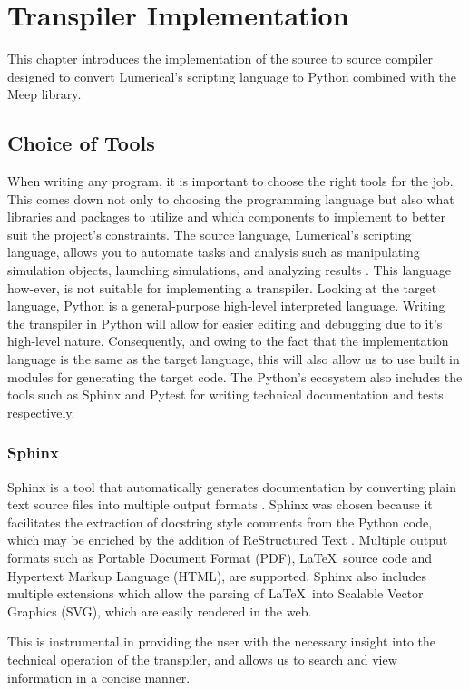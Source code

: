 \chapter{Transpiler Implementation}
This chapter introduces the implementation of the source to source compiler designed to convert Lumerical's scripting language to Python combined with the Meep library. 
\section{Choice of Tools}
When writing any program, it is important to choose the right tools for the job. This comes down not only to choosing the programming language but also what libraries and packages to utilize and which components to implement to better suit the project's constraints. The source language, Lumerical's scripting language, allows you to automate tasks and analysis such as manipulating simulation objects, launching simulations, and analyzing results \cite{ansys_lsf}. This language how-ever, is not suitable for implementing a transpiler. Looking at the target language, Python is a general-purpose high-level interpreted language. Writing the transpiler in Python will allow for easier editing and debugging due to it's high-level nature. Consequently, and owing to the fact that the implementation language is the same as the target language, this will also allow us to use built in modules for generating the target code. The Python's ecosystem also includes the tools such as Sphinx and Pytest for writing technical documentation and tests respectively.

\subsection{Sphinx}
Sphinx is a tool that automatically generates documentation by converting plain text source files into multiple output formats \cite{sphinx_quickstart}. Sphinx was chosen because it facilitates the extraction of docstring style comments from the Python code, which may be enriched by the addition of ReStructured Text \cite{docutils_rst}. Multiple output formats such as Portable Document Format (PDF), \LaTeX \ source code and Hypertext Markup Language (HTML), are supported. Sphinx also includes multiple extensions which allow the parsing of \LaTeX \ into Scalable Vector Graphics (SVG), which are easily rendered in the web.

This is instrumental in providing the user with the necessary insight into the technical operation of the transpiler, and allows us to search and view information in a concise manner.

